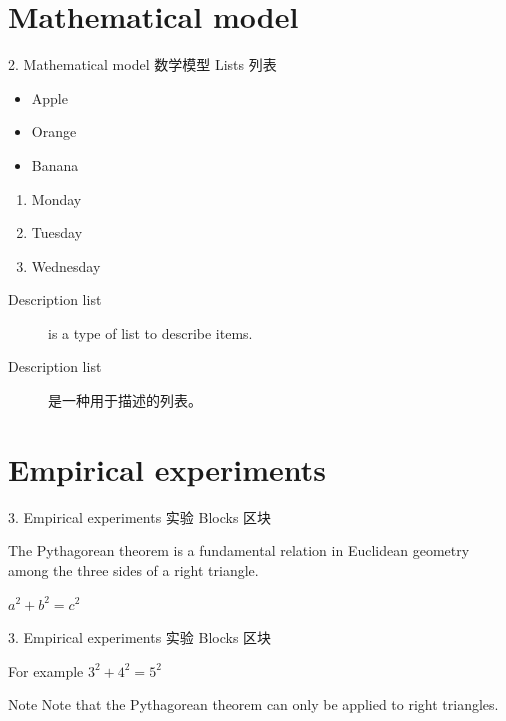 \documentclass{beamer}
\begin{document}
  \section{Mathematical model}
  \label{Sec:model}
  \begin{frame}{2. Mathematical model 数学模型}
    Lists 列表

    \begin{itemize}
    \item Apple
    \item Orange
    \item Banana
    \end{itemize}

    \begin{enumerate}
    \item Monday
    \item Tuesday
    \item Wednesday
    \end{enumerate}

    \begin{description}
    \item[Description list] is a type of list to describe items.
    \item[Description list] 是一种用于描述的列表。
    \end{description}
  \end{frame} 

  \section{Empirical experiments}
  \label{Sec:experiments}
  \begin{frame}{3. Empirical experiments 实验}
    Blocks 区块

      \begin{definition}
        The Pythagorean theorem is a fundamental relation in Euclidean geometry among the three sides of a right triangle.
      \end{definition}

      \begin{theorem}
        $a^2 + b^2 = c^2$
      \end{theorem}
  \end{frame} 

  \begin{frame}{3. Empirical experiments 实验}
    Blocks 区块

      \begin{exampleblock}{For example}
        $3^2 + 4^2 = 5^2$
      \end{exampleblock}

      \begin{alertblock}{Note}
         Note that the Pythagorean theorem can only be applied to right triangles.
      \end{alertblock}
  \end{frame} 
\end{document}
